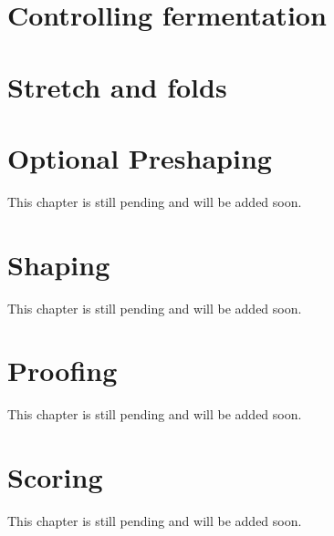 \section{Controlling fermentation}
\section{Stretch and folds}
\section{Optional Preshaping}
This chapter is still pending and will be added soon.

\section{Shaping}
This chapter is still pending and will be added soon.

\section{Proofing}
This chapter is still pending and will be added soon.

\section{Scoring}
This chapter is still pending and will be added soon.
